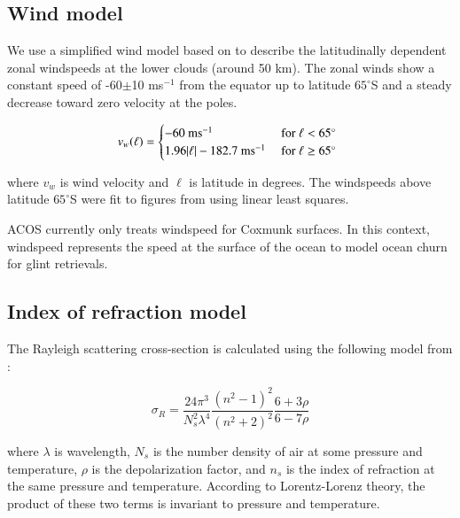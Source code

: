 \documentclass[5p]{elsarticle}
\begin{document}
\subsection{Wind model}

We use a simplified wind model based on \citet{sanchez2008variable} to describe the latitudinally dependent zonal windspeeds at the lower clouds (around 50 km). The zonal winds show a constant speed of -60$\pm$10 ms$^{-1}$ from the equator up to latitude $65^{\circ}$S and a steady decrease toward zero velocity at the poles.

\[
  v_{w}(\ell) = 
  \begin{cases} 
   -60 \text{ ms$^{-1}$} & \text{ for $\ell < 65^{\circ}$} \\ 
    1.96 |\ell| - 182.7 \text{ ms$^{-1}$}  & \text{ for $\ell \ge 65^{\circ}$ } 
  \end{cases}\\
\]

\noindent where $v_{w}$ is wind velocity and $\ell$ is latitude in degrees. The windspeeds above latitude $65^{\circ}$S were fit to figures from \citet{sanchez2008variable} using linear least squares.

ACOS currently only treats windspeed for Coxmunk surfaces. In this context, windspeed represents the speed at the surface of the ocean to model ocean churn for glint retrievals. 

\subsection{Index of refraction model}

The Rayleigh scattering cross-section is calculated using the following model from \citet{cox2001allen}:

\[
\sigma_{R} = \frac{24 \pi^{3}}{N_{s}^{2} \lambda^{4}} \frac{(n^{2} -1)^{2}}{(n^{2} + 2)^{2}} \frac{6 + 3 \rho}{6 - 7 \rho}
\]

\noindent where $\lambda$ is wavelength, $N_{s}$ is the number density of air at some pressure and temperature, $\rho$ is the depolarization factor, and $n_{s}$ is the index of refraction at the same pressure and temperature. According to Lorentz-Lorenz theory, the product of these two terms is invariant to pressure and temperature. 




\end{document}
